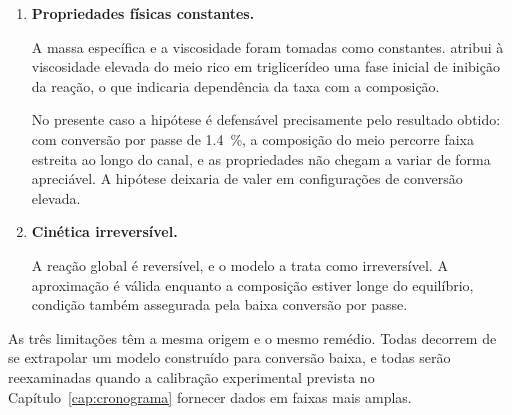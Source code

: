 \begin{enumerate}
\item \textbf{Propriedades físicas constantes.}

A massa específica e a viscosidade foram tomadas como constantes.
\textcite{Firth2014} atribui à viscosidade elevada do meio rico em
triglicerídeo uma fase inicial de inibição da reação, o que indicaria
dependência da taxa com a composição.

No presente caso a hipótese é defensável precisamente pelo resultado obtido:
com conversão por passe de \SI{1.4}{\percent}, a composição do meio percorre
faixa estreita ao longo do canal, e as propriedades não chegam a variar de forma
apreciável. A hipótese deixaria de valer em configurações de conversão elevada.

\item \textbf{Cinética irreversível.}

A reação global é reversível, e o modelo a trata como irreversível. A
aproximação é válida enquanto a composição estiver longe do equilíbrio,
condição também assegurada pela baixa conversão por passe.

\end{enumerate}

As três limitações têm a mesma origem e o mesmo remédio. Todas decorrem de se
extrapolar um modelo construído para conversão baixa, e todas serão reexaminadas
quando a calibração experimental prevista no Capítulo~\ref{cap:cronograma}
fornecer dados em faixas mais amplas.
